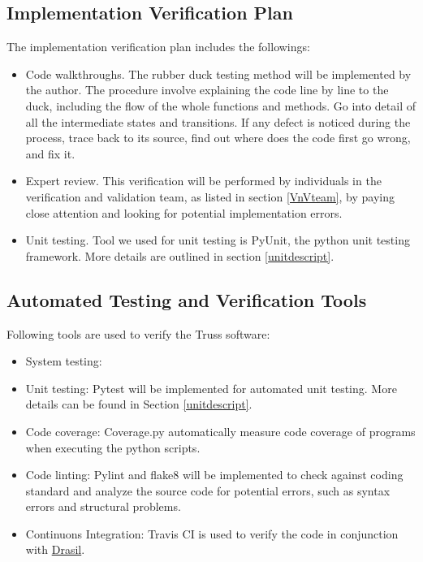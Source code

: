 \documentclass[12pt, titlepage]{article}
\begin{document}
\subsection{Implementation Verification Plan} \label{implplan}
The implementation verification plan includes the followings:
\begin{itemize}
	\item Code walkthroughs. The rubber duck testing method will be 
	implemented by the author. The procedure involve explaining the code line 
	by line to the duck, including the flow of the whole functions and methods. 
	Go into detail of all the intermediate states and transitions. If any 
	defect is noticed during the process, trace	back to its source, find out 
	where does the code first go wrong, and fix it.  
	\item Expert review. This verification will be performed by individuals in 
	the verification and validation team, as listed in section \ref{VnVteam}, 
	by paying close attention and looking for potential implementation errors. 
	\item Unit testing. Tool we used for unit testing is PyUnit, the python 
	unit testing framework. More details are outlined in section 
	\ref{unitdescript}.
\end{itemize}

\subsection{Automated Testing and Verification Tools} \label{autotool}
Following tools are used to verify the Truss software:
\begin{itemize}
	\item System testing:
	\item Unit testing: Pytest will be implemented for automated unit testing. 
	More details can be found in Section \ref{unitdescript}.
	\item Code coverage: Coverage.py automatically measure code coverage of 
	programs when executing the python scripts.
	\item Code linting: Pylint and flake8 will be implemented to check against 
	coding standard and analyze the source code for potential errors, such as 
	syntax errors and structural problems.  
	\item Continuons Integration: Travis CI is used to verify the code in 
	conjunction with \href{https://github.com/JacquesCarette/Drasil}{Drasil}.
\end{itemize}
\end{document}
